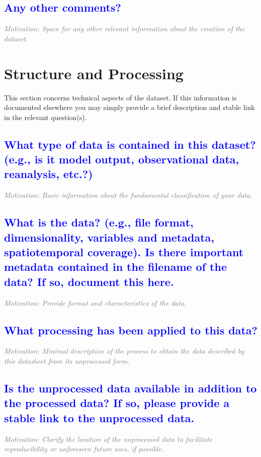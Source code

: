 \documentclass[letterpaper, 10 pt, transmag]{IEEEtran}
\begin{document}
\textcolor{blue}{\subsection{Any other comments?}}
\textcolor{gray}{\textit{Motivation: Space for any other relevant information about the creation of the dataset.}}  

\vspace{10mm}

\section{Structure and Processing}
This section concerns technical aspects of the dataset. If this information is documented elsewhere you may simply provide a brief description and stable link in the relevant question(s).

\textcolor{blue}{\subsection{What type of data is contained in this dataset? (e.g., is it model output, observational data, reanalysis, etc.?)}}
\textcolor{gray}{\textit{Motivation: Basic information about the fundamental classification of your data.}}

\textcolor{blue}{\subsection{What is the data? (e.g., file format, dimensionality, variables and metadata, spatiotemporal coverage). Is there important metadata contained in the filename of the data? If so, document this here.}}
\textcolor{gray}{\textit{Motivation: Provide format and characteristics of the data.}}

\textcolor{blue}{\subsection{What processing has been applied to this data?}}
\textcolor{gray}{\textit{Motivation: Minimal description of the process to obtain the data described by this datasheet from its unprocessed form.}}

\textcolor{blue}{\subsection{Is the unprocessed data available in addition to the processed data? If so, please provide a stable link to the unprocessed data.}}
\textcolor{gray}{\textit{Motivation: Clarify the location of the unprocessed data to facilitate reproducibility or unforeseen future uses, if possible.}}
\end{document}
